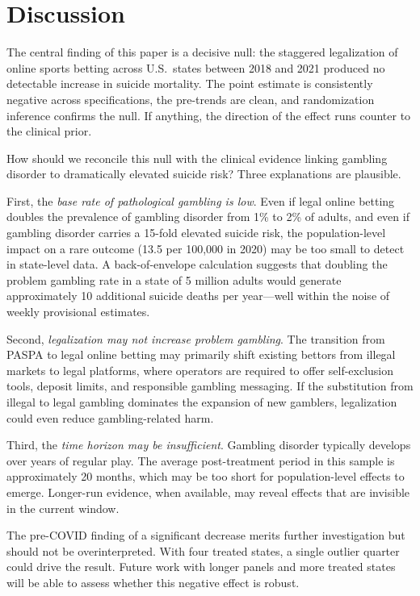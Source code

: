\documentclass[12pt]{article}
\begin{document}
\section{Discussion}

The central finding of this paper is a decisive null: the staggered legalization of online sports betting across U.S.\ states between 2018 and 2021 produced no detectable increase in suicide mortality. The point estimate is consistently negative across specifications, the pre-trends are clean, and randomization inference confirms the null. If anything, the direction of the effect runs counter to the clinical prior.

How should we reconcile this null with the clinical evidence linking gambling disorder to dramatically elevated suicide risk? Three explanations are plausible.

First, the \textit{base rate of pathological gambling is low}. Even if legal online betting doubles the prevalence of gambling disorder from 1\% to 2\% of adults, and even if gambling disorder carries a 15-fold elevated suicide risk, the population-level impact on a rare outcome (13.5 per 100,000 in 2020) may be too small to detect in state-level data. A back-of-envelope calculation suggests that doubling the problem gambling rate in a state of 5 million adults would generate approximately 10 additional suicide deaths per year---well within the noise of weekly provisional estimates.

Second, \textit{legalization may not increase problem gambling}. The transition from PASPA to legal online betting may primarily shift existing bettors from illegal markets to legal platforms, where operators are required to offer self-exclusion tools, deposit limits, and responsible gambling messaging. If the substitution from illegal to legal gambling dominates the expansion of new gamblers, legalization could even reduce gambling-related harm.

Third, the \textit{time horizon may be insufficient}. Gambling disorder typically develops over years of regular play. The average post-treatment period in this sample is approximately 20 months, which may be too short for population-level effects to emerge. Longer-run evidence, when available, may reveal effects that are invisible in the current window.

The pre-COVID finding of a significant decrease merits further investigation but should not be overinterpreted. With four treated states, a single outlier quarter could drive the result. Future work with longer panels and more treated states will be able to assess whether this negative effect is robust.
\end{document}
